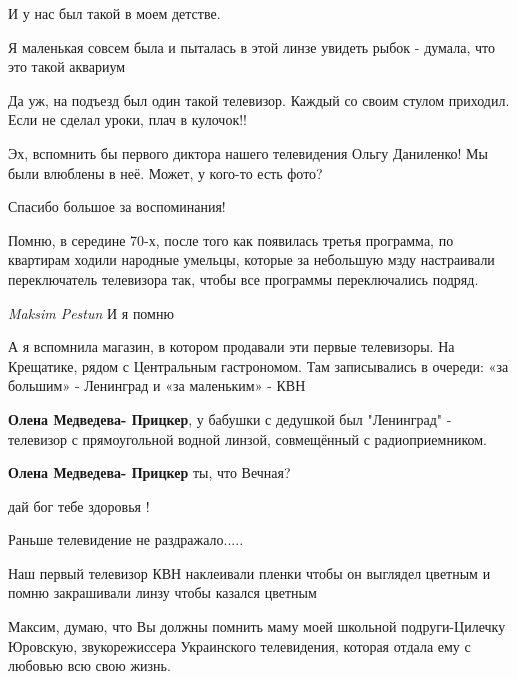 \begin{itemize}

И у нас был такой в моем детстве.


Я маленькая совсем была и пыталась в этой линзе увидеть рыбок - думала, что это
такой аквариум


Да уж, на подъезд был один такой телевизор.
Каждый со своим стулом приходил.
Если не сделал уроки, плач в кулочок!!


Эх, вспомнить бы первого диктора нашего телевидения Ольгу Даниленко! Мы были
влюблены в неё. Может, у кого-то есть фото?


Спасибо большое за воспоминания!

Помню, в середине 70-х, после того как появилась третья программа, по квартирам
ходили народные умельцы, которые за небольшую мзду настраивали переключатель
телевизора так, чтобы все программы переключались подряд.

\begin{itemize} %
\emph{Maksim Pestun}
И я помню
\end{itemize} %


А я вспомнила магазин, в котором продавали эти первые телевизоры. На
Крещатике, рядом с Центральным гастрономом. Там записывались в очереди: «за
большим» - Ленинград и «за маленьким» - КВН

\begin{itemize} %
\textbf{Олена Медведева- Прицкер}, у бабушки с дедушкой был "Ленинград" - телевизор с прямоугольной водной линзой, совмещённый с радиоприемником.

\textbf{Олена Медведева- Прицкер} ты, что Вечная?

дай бог тебе здоровья !
\end{itemize} %


Раньше телевидение не раздражало.....


Наш первый телевизор КВН наклеивали пленки чтобы он выглядел цветным и помню
закрашивали линзу чтобы казался цветным


Максим, думаю, что Вы должны помнить маму моей школьной подруги-Цилечку
Юровскую, звукорежиссера Украинского телевидения, которая отдала ему с любовью
всю свою жизнь.


\end{itemize} %
